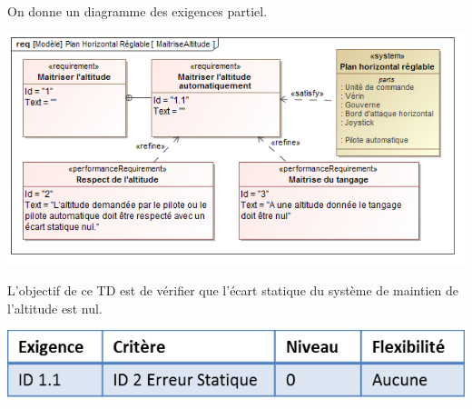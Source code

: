 \documentclass[11pt,oneside]{article}
\begin{document}
\begin{minipage}{.5\linewidth}

On donne un diagramme des exigences partiel.
\begin{center}
\includegraphics[width=\textwidth]{png/MaitriseAltitude}
\end{center}
\end{minipage}\hfill
\begin{minipage}{.47\linewidth}

\begin{obj}
L'objectif de ce TD est de vérifier que l'écart statique du système de maintien de l'altitude est nul.

\begin{center}
\includegraphics[width=\textwidth]{png/cdc}
\end{center}

\end{obj}
\end{minipage}
\end{document}
